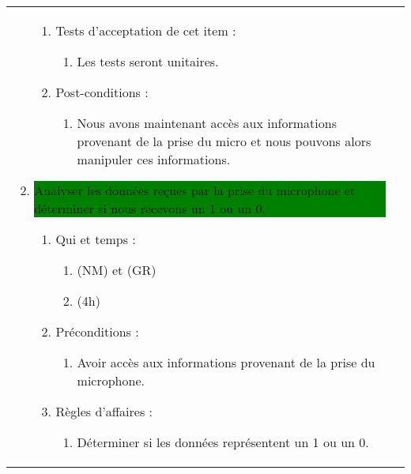 \begin{longtable}{|l|p{}|}
\begin{enumerate}[label*=\arabic*.]
\begin{enumerate}[label*=\arabic*.]
                                \item Tests d'acceptation de cet item :
                                \begin{enumerate}[label*=\arabic*.]
                                    \item Les tests seront unitaires.
                                \end{enumerate}
                                \item Post-conditions :
                                \begin{enumerate}[label*=\arabic*.]
                                    \item Nous avons maintenant accès aux informations provenant de la prise du micro et nous pouvons alors manipuler ces informations.
                                \end{enumerate}
                            \end{enumerate}
            \item \colorbox{Green}{\parbox{13cm}{Analyser les données reçues par la prise du microphone et déterminer si nous recevons un 1 ou un 0.}}
                \begin{enumerate}[label*=\arabic*.]
                                \item Qui et temps :
                                \begin{enumerate}[label*=\arabic*.]
                                    \item (NM) et (GR)
                                    \item (4h)
                                \end{enumerate}
                                \item Préconditions :
                                \begin{enumerate}[label*=\arabic*.]
                                    \item Avoir accès aux informations provenant de la prise du microphone.
                                \end{enumerate}
                                \item Règles d'affaires :
                                \begin{enumerate}[label*=\arabic*.]
                                    \item Déterminer si les données représentent un 1 ou un 0.
                                \end{enumerate}

\end{enumerate}
\end{enumerate}
\end{longtable}
